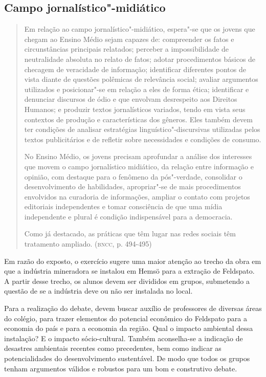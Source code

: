 \documentclass[12pt]{extarticle}
\begin{document}
\subsection{Campo jornalístico"-midiático}

\begin{quote}
Em relação ao campo jornalístico"-midiático, espera"-se que os jovens
que chegam ao Ensino Médio sejam capazes de: compreender os fatos e
circunstâncias principais relatados; perceber a impossibilidade de
neutralidade absoluta no relato de fatos; adotar procedimentos básicos
de checagem de veracidade de informação; identificar diferentes pontos
de vista diante de questões polêmicas de relevância social; avaliar
argumentos utilizados e posicionar"-se em relação a eles de forma ética;
identificar e denunciar discursos de ódio e que envolvam desrespeito aos
Direitos Humanos; e produzir textos jornalísticos variados, tendo em
vista seus contextos de produção e características dos gêneros. Eles
também devem ter condições de analisar estratégias
linguístico"-discursivas utilizadas pelos textos publicitários e de
refletir sobre necessidades e condições de consumo.

No Ensino Médio, os jovens precisam aprofundar a análise dos interesses
que movem o campo jornalístico midiático, da relação entre informação e
opinião, com destaque para o fenômeno da pós"-verdade, consolidar o
desenvolvimento de habilidades, apropriar"-se de mais procedimentos
envolvidos na curadoria de informações, ampliar o contato com projetos
editoriais independentes e tomar consciência de que uma mídia
independente e plural é condição indispensável para a democracia.

Como já destacado, as práticas que têm lugar nas redes sociais têm
tratamento ampliado. (\textsc{bncc}, p. 494-495)
\end{quote}


Em razão do exposto, o exercício sugere uma maior atenção ao trecho da
obra em que a indústria mineradora se instalou em Hemsö para a
extração de Feldspato. A partir desse trecho, os alunos devem ser
divididos em grupos, submetendo a questão de se a indústria deve ou
não ser instalada no local.

Para a realização do debate, devem buscar auxílio de professores de
diversas áreas do colégio, para trazer elementos do potencial econômico
do Feldspato para a economia do país e para a economia da região. Qual o
impacto ambiental dessa instalação? E o impacto sócio-cultural. Também
aconselha-se a indicação de desastres ambientais recentes como
precedentes, bem como indicar as potencialidades do desenvolvimento
sustentável. De modo que todos os grupos tenham argumentos válidos e
robustos para um bom e construtivo debate.
\end{document}
